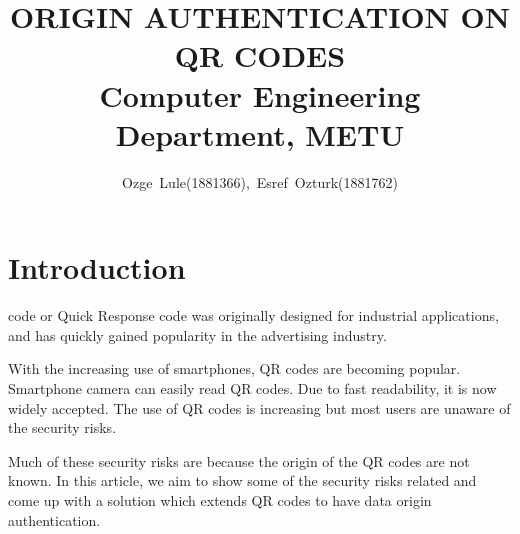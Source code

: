 \documentclass[12pt,journal,compsoc]{IEEEtran}
\begin{document}
\title{
	\huge ORIGIN AUTHENTICATION ON QR CODES \\
    \Large Computer Engineering Department, METU}


\author{\normalsize Ozge~Lule(1881366),~Esref~Ozturk(1881762)}




\maketitle

\IEEEdisplaynontitleabstractindextext

\IEEEpeerreviewmaketitle



\section{Introduction}


 code or Quick Response code was originally designed for industrial applications, and has quickly gained popularity in the advertising industry.

With the increasing use of smartphones, QR codes are becoming popular. Smartphone camera can easily read QR codes. Due to fast readability, it is now widely accepted. The use of QR codes is increasing but most users are unaware of the security risks.


Much of these security risks are because the origin of the QR codes are not known. In this article, we aim to show some of the security risks related and come up with a solution which extends QR codes to have data origin authentication.
\end{document}
